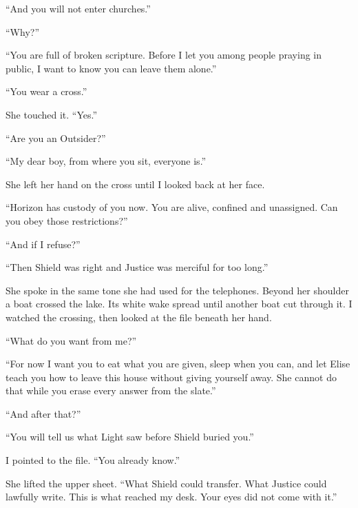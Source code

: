 ``And you will not enter churches.''\par

``Why?''\par

``You are full of broken scripture. Before I let you among people praying in public, I want to know you can leave them alone.''\par

``You wear a cross.''\par

She touched it. ``Yes.''\par

``Are you an Outsider?''\par

``My dear boy, from where you sit, everyone is.''\par

She left her hand on the cross until I looked back at her face.\par

``Horizon has custody of you now. You are alive, confined and unassigned. Can you obey those restrictions?''\par

``And if I refuse?''\par

``Then Shield was right and Justice was merciful for too long.''\par

She spoke in the same tone she had used for the telephones. Beyond her shoulder a boat crossed the lake. Its white wake spread until another boat cut through it. I watched the crossing, then looked at the file beneath her hand.\par

``What do you want from me?''\par

``For now I want you to eat what you are given, sleep when you can, and let Elise teach you how to leave this house without giving yourself away. She cannot do that while you erase every answer from the slate.''\par

``And after that?''\par

``You will tell us what Light saw before Shield buried you.''\par

I pointed to the file. ``You already know.''\par

She lifted the upper sheet. ``What Shield could transfer. What Justice could lawfully write. This is what reached my desk. Your eyes did not come with it.''\par

